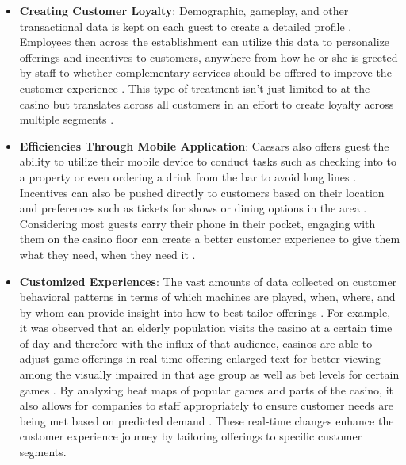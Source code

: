 \documentclass[sigconf]{acmart}
\begin{document}
\begin{itemize}
 \item \textbf{Creating Customer Loyalty}: Demographic, gameplay, and other transactional data is kept on each guest to create a detailed profile \cite{Welch2012}. Employees then across the establishment can utilize this data to personalize offerings and incentives to customers, anywhere from how he or she is greeted by staff to whether complementary services should be offered to improve the customer experience \cite{Welch2012}. This type of treatment isn't just limited to  at the casino but translates across all customers in an effort to create loyalty across multiple segments \cite{Welch2012}. 
 \item \textbf{Efficiencies Through Mobile Application}: Caesars also offers guest the ability to utilize their mobile device to conduct tasks such as checking into to a property or even ordering a drink from the bar to avoid long lines \cite{Welch2012}. Incentives can also be pushed directly to customers based on their location and preferences such as tickets for shows or dining options in the area \cite{Welch2012}. Considering most guests carry their phone in their pocket, engaging with them on the casino floor can create a better customer experience to give them what they need, when they need it \cite{Welch2012}. 
\item \textbf{Customized Experiences}: The vast amounts of data collected on customer behavioral patterns in terms of which machines are played, when, where, and by whom can provide insight into how to best tailor offerings \cite{Schull2012}. For example, it was observed that an elderly population visits the casino at a certain time of day and therefore with the influx of that audience, casinos are able to adjust game offerings in real-time offering enlarged text for better viewing among the visually impaired in that age group as well as bet levels for certain games \cite{Schull2012}. By analyzing heat maps of popular games and parts of the casino, it also allows for companies to staff appropriately to ensure customer needs are being met based on predicted demand \cite{Schull2012}. These real-time changes enhance the customer experience journey by tailoring offerings to specific customer segments. 
\end{itemize}
\end{document}
